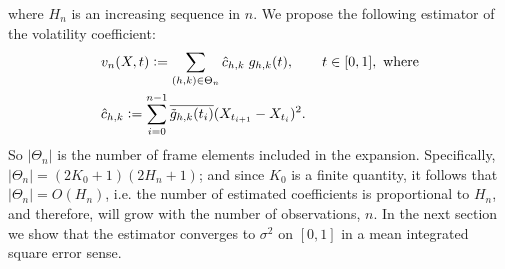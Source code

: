where $H_n$ is an increasing sequence in $n$.    
We propose the following estimator of the volatility coefficient:
\begin{align}
  \label{eq:contvolestimator}
  &v_n(X, t) := \sum_{(h,k) \in \Theta_n} \hat{c}_{h,k}\;g_{h,k}(t), \qquad  t \in [0,1], \text{ where}\\
  &\hat{c}_{h,k} := \sum_{i =0}^{n-1} \overline{\tilde{g}_{h,k}(t_i)} (X_{t_{i+1}} - X_{t_i})^2.
\end{align}
So $\vert \Theta_n \vert $ is the number of frame elements included in the expansion. Specifically,   $\vert \Theta_n\vert = (2K_0 + 1)(2H_n+1)$; and since $K_0$ is a finite quantity, it follows that $\vert\Theta_n\vert = O(H_n)$, i.e. the number of estimated coefficients is proportional to $H_n$, and therefore, will grow with the number of observations, $n$. 
In the next section we show that the estimator converges to $\sigma^2$ on $[0,1]$ in a mean integrated square error sense.

